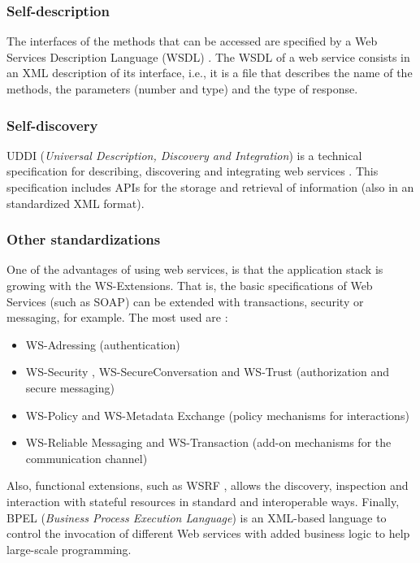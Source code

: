 \subsubsection{Self-description} The interfaces of the methods that can be accessed are specified by a Web Services Description Language (WSDL) \cite{WSDL}. The WSDL of a web service consists in an XML description of its interface, i.e., it is a file that describes the name of the methods, the parameters (number and type) and the type of response.

\subsubsection{Self-discovery} UDDI ({\em Universal Description, Discovery and Integration}) \cite{UDDI} is a technical specification for describing, discovering and integrating web services \cite{Cerami2002Webservices}. This specification includes APIs for the storage and retrieval of information (also in an standardized XML format).


\subsubsection{Other standardizations} One of the advantages of using web services, is that the application stack is growing with the WS-Extensions. That is, the basic specifications of Web Services (such as SOAP) can be extended with transactions, security or messaging, for example. The most used are \cite{Papazoglou2007SOA}:
\begin{itemize}
  \item WS-Adressing  (authentication)
  \item WS-Security , WS-SecureConversation  and WS-Trust  (authorization and secure messaging)
  \item WS-Policy and WS-Metadata Exchange (policy mechanisms for interactions)
  \item WS-Reliable Messaging  and WS-Transaction (add-on mechanisms for the communication channel)
\end{itemize}

Also, functional extensions, such as WSRF \cite{WSRF}, allows the discovery, inspection and interaction with stateful resources in standard and interoperable ways. Finally, BPEL ({\em Business Process Execution Language})  \cite{BPEL} is an XML-based language to control the invocation of different Web services with added business logic to help large-scale programming.

